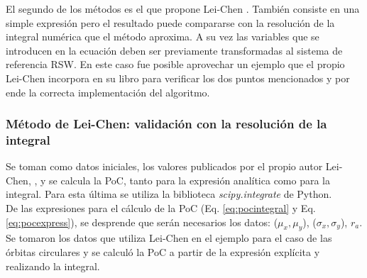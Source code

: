 El segundo de los m\'etodos es el que propone Lei-Chen \citep{leichen}. Tambi\'en consiste en una simple expresi\'on pero el resultado puede compararse con la resoluci\'on de la integral num\'erica que el m\'etodo aproxima. A su vez las variables que se introducen en la ecuaci\'on deben ser previamente transformadas al sistema de referencia RSW. En este caso fue posible aprovechar un ejemplo que el propio Lei-Chen incorpora en su libro para verificar los dos puntos mencionados y por ende la correcta implementaci\'on del algoritmo.

\subsubsection*{M\'etodo de Lei-Chen: validaci\'on con la resoluci\'on de la integral}
Se toman como datos iniciales, los valores publicados por el propio autor Lei-Chen, \citep{leichen}, y se calcula la PoC, tanto para la expresi\'on anal\'itica como para la integral. Para esta \'ultima se utiliza la biblioteca {\it{scipy.integrate}}  de Python.\\

De las expresiones para el c\'alculo de la PoC (Eq. \ref{eq:pocintegral} y Eq. \ref{eq:pocexpress}), se desprende que ser\'an necesarios los datos: ($\mu_{x}, \mu_{y}$), ($\sigma_{x}, \sigma_{y}$), $r_{a}$.\\

Se tomaron los datos que utiliza Lei-Chen en el ejemplo para el caso de las \'orbitas circulares y se calcul\'o la PoC a partir de la expresi\'on expl\'icita y realizando la integral.\\

